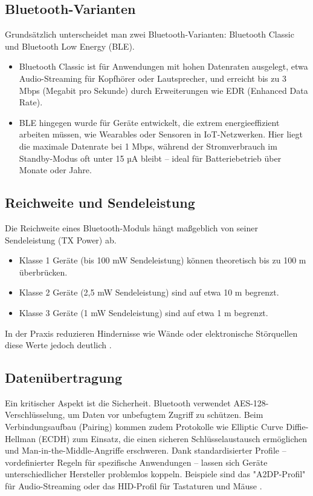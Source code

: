 \subsection{Bluetooth-Varianten}

Grundsätzlich unterscheidet man zwei Bluetooth-Varianten: 
Bluetooth Classic und Bluetooth Low Energy (BLE).

\begin{itemize}
    \item Bluetooth Classic ist für Anwendungen mit hohen Datenraten ausgelegt, etwa Audio-Streaming für Kopfhörer oder Lautsprecher, und erreicht bis zu 3 Mbps (Megabit pro Sekunde) durch Erweiterungen wie EDR (Enhanced Data Rate).
    
    \item BLE hingegen wurde für Geräte entwickelt, die extrem energieeffizient arbeiten müssen, wie Wearables oder Sensoren in IoT-Netzwerken. Hier liegt die maximale Datenrate bei 1 Mbps, während der Stromverbrauch im Standby-Modus oft unter 15 µA bleibt – ideal für Batteriebetrieb über Monate oder Jahre.
    
\end{itemize}

\subsection{Reichweite und Sendeleistung}

Die Reichweite eines Bluetooth-Moduls hängt maßgeblich von seiner Sendeleistung (TX Power) ab. 

\begin{itemize}
    \item Klasse 1 Geräte (bis 100 mW Sendeleistung)  können theoretisch bis zu 100 m überbrücken.
    \item Klasse 2 Geräte (2,5 mW Sendeleistung) sind auf  etwa 10 m begrenzt.
    \item Klasse 3 Geräte (1 mW Sendeleistung)  sind auf etwa 1 m begrenzt.
\end{itemize}

In der Praxis reduzieren Hindernisse wie Wände oder elektronische Störquellen diese Werte jedoch deutlich  \cite{Sauter:2022}.

\subsection{Datenübertragung}
Ein kritischer Aspekt ist die Sicherheit. Bluetooth verwendet AES-128-Verschlüsselung, um Daten vor unbefugtem Zugriff zu schützen. Beim Verbindungsaufbau (Pairing) kommen zudem Protokolle wie Elliptic Curve Diffie-Hellman (ECDH) zum Einsatz, die einen sicheren Schlüsselaustausch ermöglichen und Man-in-the-Middle-Angriffe erschweren. Dank standardisierter Profile – vordefinierter Regeln für spezifische Anwendungen – lassen sich Geräte unterschiedlicher Hersteller problemlos koppeln. Beispiele sind das "A2DP-Profil" für Audio-Streaming oder das HID-Profil für Tastaturen und Mäuse \cite{Sauter:2022}.

